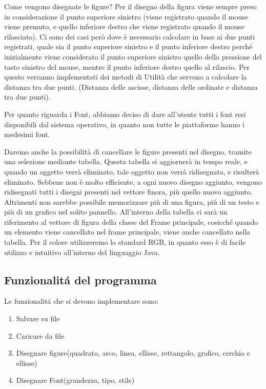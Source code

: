 \documentclass[a4paper,12pt,times,numbered,print,index]{article}
\begin{document}
Come vengono disegnate le figure?
Per il disegno della figura viene sempre preso in considerazione il punto superiore sinistro (viene registrato quando il mouse viene premuto, e quello inferiore destro che viene registrato quando il mouse rilasciato).
Ci sono dei casi però dove è necessario calcolare in base ai due punti registrati, quale sia il punto superiore sinistro e il punto inferiore destro perché inizialmente viene considerato il punto superiore sinistro quello della pressione del tasto sinistro del mouse, mentre il punto inferiore destro quello al rilascio.
Per questo verranno implementati dei metodi di Utilità che servono a calcolare la distanza tra due punti. (Distanza delle ascisse, distanza delle ordinate e distanza tra due punti).

Per quanto riguarda i Font, abbiamo deciso di dare all’utente tutti i font resi disponibili dal sistema operativo, in quanto non tutte le piattaforme hanno i medesimi font.

Daremo anche la possibilità di cancellare le figure presenti nel disegno, tramite una selezione mediante tabella.
Questa tabella si aggiornerà in tempo reale, e quando un oggetto verrà eliminato, tale oggetto non verrà ridisegnato, e risulterà eliminato.
Sebbene non è molto efficiente, a ogni nuovo disegno aggiunto, vengono ridisegnati tutti i disegni presenti nel vettore finora, più quello nuovo aggiunto.
Altrimenti non sarebbe possibile memorizzare più di una figura, più di un testo e più di un grafico nel solito pannello.
All’interno della tabella ci sarà un riferimento al vettore di figura della classe del Frame principale, cosicché quando un elemento viene cancellato nel frame principale, viene anche cancellato nella tabella.
Per il colore utilizzeremo lo standard RGB, in quanto esso è di facile utilizzo e intuitivo all’interno del linguaggio Java.


\subsection{Funzionalitá del programma}
Le funzionalitá che si devono implementare sono:
\begin{enumerate}
	\item Salvare su file
	\item Caricare da file
	\item Disegnare figure(quadrato, arco, linea, ellisse, rettangolo, grafico, cerchio e ellisse)
	\item Disegnare Font(grandezza, tipo,  stile)
\end{enumerate}
\end{document}
